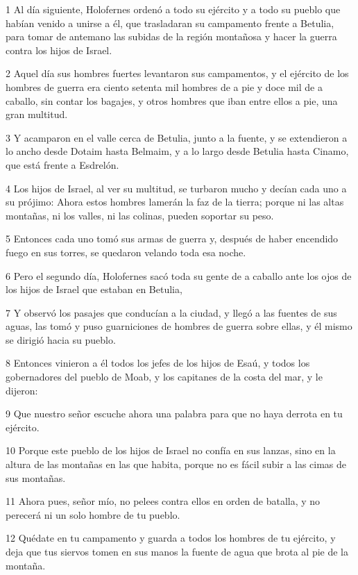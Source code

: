 \par 1 Al día siguiente, Holofernes ordenó a todo su ejército y a todo su pueblo que habían venido a unirse a él, que trasladaran su campamento frente a Betulia, para tomar de antemano las subidas de la región montañosa y hacer la guerra contra los hijos de Israel.
\par 2 Aquel día sus hombres fuertes levantaron sus campamentos, y el ejército de los hombres de guerra era ciento setenta mil hombres de a pie y doce mil de a caballo, sin contar los bagajes, y otros hombres que iban entre ellos a pie, una gran multitud.
\par 3 Y acamparon en el valle cerca de Betulia, junto a la fuente, y se extendieron a lo ancho desde Dotaim hasta Belmaim, y a lo largo desde Betulia hasta Cinamo, que está frente a Esdrelón.
\par 4 Los hijos de Israel, al ver su multitud, se turbaron mucho y decían cada uno a su prójimo: Ahora estos hombres lamerán la faz de la tierra; porque ni las altas montañas, ni los valles, ni las colinas, pueden soportar su peso.
\par 5 Entonces cada uno tomó sus armas de guerra y, después de haber encendido fuego en sus torres, se quedaron velando toda esa noche.
\par 6 Pero el segundo día, Holofernes sacó toda su gente de a caballo ante los ojos de los hijos de Israel que estaban en Betulia,
\par 7 Y observó los pasajes que conducían a la ciudad, y llegó a las fuentes de sus aguas, las tomó y puso guarniciones de hombres de guerra sobre ellas, y él mismo se dirigió hacia su pueblo.
\par 8 Entonces vinieron a él todos los jefes de los hijos de Esaú, y todos los gobernadores del pueblo de Moab, y los capitanes de la costa del mar, y le dijeron:
\par 9 Que nuestro señor escuche ahora una palabra para que no haya derrota en tu ejército.
\par 10 Porque este pueblo de los hijos de Israel no confía en sus lanzas, sino en la altura de las montañas en las que habita, porque no es fácil subir a las cimas de sus montañas.
\par 11 Ahora pues, señor mío, no pelees contra ellos en orden de batalla, y no perecerá ni un solo hombre de tu pueblo.
\par 12 Quédate en tu campamento y guarda a todos los hombres de tu ejército, y deja que tus siervos tomen en sus manos la fuente de agua que brota al pie de la montaña.
